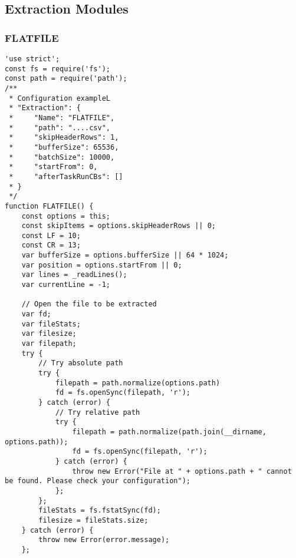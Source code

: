 \subsection{Extraction Modules}
\subsubsection{FLATFILE}
\label{netl-extract-flatfile}
\begin{verbatim}
'use strict';
const fs = require('fs');
const path = require('path');
/**
 * Configuration exampleL
 * "Extraction": {
 *     "Name": "FLATFILE",
 *     "path": "....csv",
 *     "skipHeaderRows": 1,
 *     "bufferSize": 65536,
 *     "batchSize": 10000,
 *     "startFrom": 0,
 *     "afterTaskRunCBs": []
 * }
 */
function FLATFILE() {
    const options = this;
    const skipItems = options.skipHeaderRows || 0;
    const LF = 10;
    const CR = 13;
    var bufferSize = options.bufferSize || 64 * 1024;
    var position = options.startFrom || 0;
    var lines = _readLines();
    var currentLine = -1;

    // Open the file to be extracted
    var fd;
    var fileStats;
    var filesize;
    var filepath;
    try {
        // Try absolute path
        try {
            filepath = path.normalize(options.path)
            fd = fs.openSync(filepath, 'r');
        } catch (error) {
            // Try relative path
            try {
                filepath = path.normalize(path.join(__dirname, options.path));
                fd = fs.openSync(filepath, 'r');
            } catch (error) {
                throw new Error("File at " + options.path + " cannot be found. Please check your configuration");
            };
        };
        fileStats = fs.fstatSync(fd);
        filesize = fileStats.size;
    } catch (error) {
        throw new Error(error.message);
    };


\end{verbatim}
